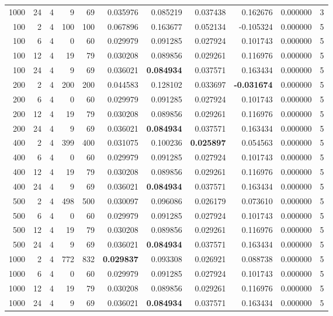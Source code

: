 \begin{table}
\begin{tabular}{rrrrrrrrrrr}
1000 & 24 & 4 & 9 & 69 & 0.035976 & 0.085219 & 0.037438 & 0.162676 & 0.000000 & 3 \\
100 & 2 & 4 & 100 & 100 & 0.067896 & 0.163677 & 0.052134 & -0.105324 & 0.000000 & 5 \\
100 & 6 & 4 & 0 & 60 & 0.029979 & 0.091285 & 0.027924 & 0.101743 & 0.000000 & 5 \\
100 & 12 & 4 & 19 & 79 & 0.030208 & 0.089856 & 0.029261 & 0.116976 & 0.000000 & 5 \\
100 & 24 & 4 & 9 & 69 & 0.036021 & \textbf{0.084934} & 0.037571 & 0.163434 & 0.000000 & 5 \\
200 & 2 & 4 & 200 & 200 & 0.044583 & 0.128102 & 0.033697 & \textbf{-0.031674} & 0.000000 & 5 \\
200 & 6 & 4 & 0 & 60 & 0.029979 & 0.091285 & 0.027924 & 0.101743 & 0.000000 & 5 \\
200 & 12 & 4 & 19 & 79 & 0.030208 & 0.089856 & 0.029261 & 0.116976 & 0.000000 & 5 \\
200 & 24 & 4 & 9 & 69 & 0.036021 & \textbf{0.084934} & 0.037571 & 0.163434 & 0.000000 & 5 \\
400 & 2 & 4 & 399 & 400 & 0.031075 & 0.100236 & \textbf{0.025897} & 0.054563 & 0.000000 & 5 \\
400 & 6 & 4 & 0 & 60 & 0.029979 & 0.091285 & 0.027924 & 0.101743 & 0.000000 & 5 \\
400 & 12 & 4 & 19 & 79 & 0.030208 & 0.089856 & 0.029261 & 0.116976 & 0.000000 & 5 \\
400 & 24 & 4 & 9 & 69 & 0.036021 & \textbf{0.084934} & 0.037571 & 0.163434 & 0.000000 & 5 \\
500 & 2 & 4 & 498 & 500 & 0.030097 & 0.096086 & 0.026179 & 0.073610 & 0.000000 & 5 \\
500 & 6 & 4 & 0 & 60 & 0.029979 & 0.091285 & 0.027924 & 0.101743 & 0.000000 & 5 \\
500 & 12 & 4 & 19 & 79 & 0.030208 & 0.089856 & 0.029261 & 0.116976 & 0.000000 & 5 \\
500 & 24 & 4 & 9 & 69 & 0.036021 & \textbf{0.084934} & 0.037571 & 0.163434 & 0.000000 & 5 \\
1000 & 2 & 4 & 772 & 832 & \textbf{0.029837} & 0.093308 & 0.026921 & 0.088738 & 0.000000 & 5 \\
1000 & 6 & 4 & 0 & 60 & 0.029979 & 0.091285 & 0.027924 & 0.101743 & 0.000000 & 5 \\
1000 & 12 & 4 & 19 & 79 & 0.030208 & 0.089856 & 0.029261 & 0.116976 & 0.000000 & 5 \\
1000 & 24 & 4 & 9 & 69 & 0.036021 & \textbf{0.084934} & 0.037571 & 0.163434 & 0.000000 & 5 \\

\end{tabular}
\end{table}
